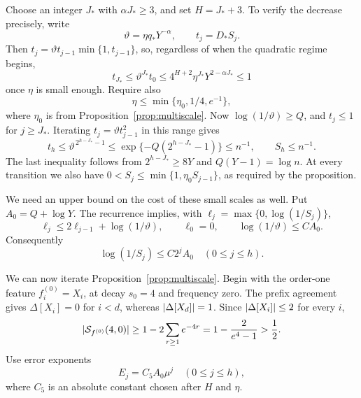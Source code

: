 Choose an integer $J_*$ with $\alpha J_*\ge3$, and set $H=J_*+3$.
To verify the decrease precisely, write
\[
 \vartheta=\eta q_*Y^{-\alpha},\qquad t_j=D_*S_j.
\]
Then $t_j=\vartheta t_{j-1}\min\{1,t_{j-1}\}$, so, regardless of when
the quadratic regime begins,
\[
 t_{J_*}\le \vartheta^{J_*}t_0
 \le4^{H+2}\eta^{J_*}Y^{2-\alpha J_*}\le1
\]
once $\eta$ is small enough.  Require also
\[
 \eta\le\min\{\eta_0,1/4,e^{-1}\},
\]
where $\eta_0$ is from Proposition~\ref{prop:multiscale}.
Now $\log(1/\vartheta)\ge Q$, and $t_j\le1$ for $j\ge J_*$.  Iterating
$t_j=\vartheta t_{j-1}^2$ in this range gives
\begin{equation}
 t_h\le\vartheta^{\,2^{h-J_*}-1}
       \le \exp\{-Q(2^{h-J_*}-1)\}\le n^{-1},
 \qquad S_h\le n^{-1}.
 \label{eq:terminal-scale}
\end{equation}
The last inequality follows from $2^{h-J_*}\ge8Y$ and
$Q(Y-1)=\log n$.  At every transition we also have
$0<S_j\le\min\{1,\eta_0S_{j-1}\}$, as required by the proposition.

We need an upper bound on the cost of these small scales as well.
Put $A_0=Q+\log Y$.  The recurrence implies, with
$\ell_j=\max\{0,\log(1/S_j)\}$,
\[
 \ell_j\le2\ell_{j-1}+\log(1/\vartheta),\qquad
 \ell_0=0,\qquad \log(1/\vartheta)\le C A_0.
\]
Consequently
\begin{equation}
 \log(1/S_j)\le C2^jA_0\quad(0\le j\le h).
 \label{eq:scale-cost}
\end{equation}

We can now iterate Proposition~\ref{prop:multiscale}.  Begin with the
order-one feature $f_i^{(0)}=X_i$, at decay $s_0=4$ and frequency zero.
The prefix agreement gives $\Delta[X_i]=0$ for $i<d$, whereas
$\lvert \Delta[X_d]\rvert=1$.  Since $\lvert \Delta[X_i]\rvert\le2$ for every $i$,
\begin{equation}
 \lvert \mathcal S_{f^{(0)}}(4,0)\rvert
 \ge1-2\sum_{r\ge1}e^{-4r}
 =1-\frac{2}{e^4-1}>\frac12.
 \label{eq:initial-signal}
\end{equation}
Use error exponents
\begin{equation}
 E_j=C_5A_0\mu^j\quad(0\le j\le h),
 \label{eq:scale-errors}
\end{equation}
where $C_5$ is an absolute constant chosen after $H$ and $\eta$.

